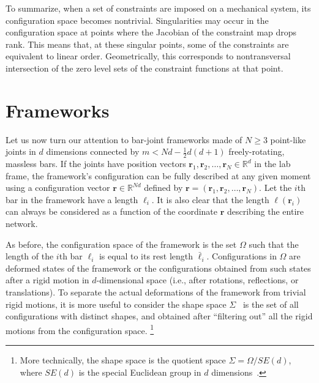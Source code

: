 To summarize, when a set of constraints are imposed on a mechanical system, its configuration space becomes nontrivial.
Singularities may occur in the configuration space at points where the Jacobian of the constraint map drops rank.
This means that, at these singular points, some of the constraints are equivalent to linear order.
Geometrically, this corresponds to nontransversal intersection of the zero level sets of the constraint functions at that point.

\section{Frameworks}
\label{sec:frameworks}

Let us now turn our attention to bar-joint frameworks made of $N \geq 3$ point-like joints in $d$ dimensions connected by $m < Nd - \frac{1}{2}d(d+1)$ freely-rotating, massless bars.
If the joints have position vectors $\bm{r}_1, \bm{r}_2, \ldots, \bm{r}_{N} \in \mathbb{R}^d$ in the lab frame, the framework's configuration can be fully described at any given moment using a configuration vector $\bm{r}\in\mathbb{R}^{N d}$ defined by $\bm{r} = (\bm{r}_1, \bm{r}_2, \ldots, \bm{r}_{N})$.
Let the $i$th bar in the framework have a length $\ell_{i}$.
It is also clear that the length $\ell(\bm{r}_{i})$ can always be considered as a function of the coordinate $\bm{r}$ describing the entire network.

As before, the configuration space of the framework is the set $\Omega$ such that the length of the $i$th bar $\ell_{i}$ is equal to its rest length $\bar{\ell}_{i}$.
Configurations in $\Omega$ are deformed states of the framework or the configurations obtained from such states after a rigid motion in $d$-dimensional space (i.e., after rotations, reflections, or translations).
To separate the actual deformations of the framework from trivial rigid motions, it is more useful to consider the shape space $\Sigma$~\cite{kendall1989,mezey1993,kendall1999} is the set of all configurations with distinct shapes, and
obtained after ``filtering out'' all the rigid motions from the configuration space.%
\footnote{More technically, the shape space is the quotient space $\Sigma = \Omega/SE(d)$, where $SE(d)$ is the special Euclidean group in $d$ dimensions~\cite{littlejohn1995}.}

